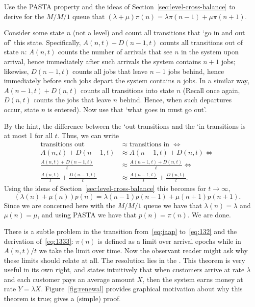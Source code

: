 \begin{exercise}
  Use the PASTA property and the ideas of Section~\ref{sec:level-cross-balance}
 to derive for the $M/M/1$ queue that
$(\lambda + \mu) \pi(n) = \lambda \pi(n-1) + \mu \pi(n+1)$.
  \begin{hint}
    Consider some state $n$ (not a level) and count all transitions that `go in and
    out of' this state. Specifically, $A(n,t) + D(n-1,t)$ counts all
    transitions out of state $n$: $A(n,t)$ counts the number of
    arrivals that see $n$ in the system upon arrival, hence
    immediately after such arrivals the system contains $n+1$ jobs;
    likewise, $D(n-1,t)$ counts all jobs that leave $n-1$ jobs behind,
    hence immediately before such jobs depart the system contains $n$
    jobs.  In a similar way, $A(n-1,t) + D(n,t)$ counts all
    transitions into state $n$ (Recall once again, $D(n,t)$ counts the
    jobs that leave $n$ behind. Hence, when such departures occur,
    state $n$ is entered). Now use that `what goes in must go out'.    
  \end{hint}
  \begin{solution}
By  the hint,  the difference between the `out
    transitions and the `in transitions is at most 1 for all $t$. Thus,  we can write
    \begin{align*}
\text{transitions out } &\approx \text{transitions in } \iff \\
      A(n,t) + D(n-1,t) &\approx A(n-1,t) + D(n,t)  \iff \\
      \frac{A(n,t) + D(n-1,t)}t &\approx \frac{A(n-1,t) + D(n, t)}t \iff \\
      \frac{A(n,t)}t + \frac{D(n-1,t)}t &\approx \frac{A(n-1,t)}t + \frac{D(n,t)}t.
    \end{align*}
Using the ideas of Section~\ref{sec:level-cross-balance} this becomes for $t\to\infty$, 
\begin{equation*}
  (\lambda(n) +\mu(n))p(n) = \lambda(n-1)p(n-1) + \mu(n+1)p(n+1).
\end{equation*}
Since we are concerned here with the $M/M/1$ queue we have that
$ \lambda(n) = \lambda$ and $\mu(n) = \mu$, and using PASTA we have
that $p(n) = \pi(n)$. We are done.
  \end{solution}
\end{exercise}



There is a subtle problem in the transition from~\eqref{eq:jaap} to~\eqref{eq:132} and the derivation
of~\eqref{eq:1333}: $\pi(n)$ is defined as a limit over arrival epochs
while in $A(n,t)/t$ we take the limit over time. Now the observant
reader might ask why these limits should relate at all.  The
resolution lies in the . This
theorem is very useful in its own right, and states  intuitively that 
when customers arrive at rate $\lambda$ and each customer pays an average amount $X$, then the system earns money at rate $Y=\lambda X$.  Figure~\ref{fig:renewal} provides graphical motivation about why this theorem is true; \citet{el-taha98:_sampl_path_analy_queuein_system}
gives  a (simple) proof.

